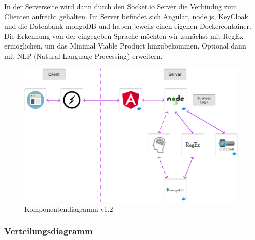 \noindent In der Serverseite wird dann durch den Socket.io Server die Verbindug zum Clienten aufrecht gehalten.
Im Server befindet sich Angular, node.js, KeyCloak und die Datenbank mongoDB und haben jeweils einen eigenen Dockercontainer. 
Die Erkennung von der eingegeben Sprache möchten wir zunächst mit RegEx ermöglichen, 
um das Minimal Viable Product hinzubekommen. Optional dann mit NLP (Natural Language Processing) erweitern.

\begin{figure}[!hbt]
\centering
\includegraphics[width=1.0\textwidth]{bilder/technologien/Komponentendiagram v1.2.png}
\caption{Komponentendiagramm v1.2}
\label{fig:Komponentendiagramm_v1.2}
\end{figure}
\FloatBarrier %

\subsubsection{Verteilungsdiagramm}

